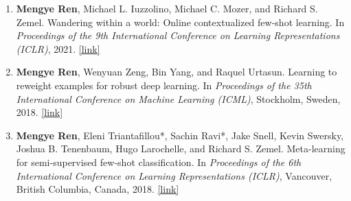 \documentclass{res}
\begin{document}
\begin{resume}
\begin{enumerate}[leftmargin=*]
\item
\textbf{Mengye Ren}, Michael L. Iuzzolino, Michael C. Mozer, and Richard S. Zemel.
Wandering within a world: Online contextualized few-shot learning.
In \textit{Proceedings of the 9th International Conference on Learning Representations (ICLR)}, 2021. \href{https://arxiv.org/abs/2007.04546}{[link]}

\item
\textbf{Mengye Ren}, Wenyuan Zeng, Bin Yang, and Raquel Urtasun.
Learning to reweight examples for robust deep learning.
In \textit{Proceedings of the 35th International Conference on Machine Learning (ICML)}, Stockholm, Sweden, 2018. \href{https://arxiv.org/abs/1803.09050}{[link]}

\item
\textbf{Mengye Ren}, Eleni Triantafillou*, Sachin Ravi*, Jake Snell, Kevin Swersky,
Joshua B. Tenenbaum, Hugo Larochelle, and Richard S. Zemel.
Meta-learning for semi-supervised few-shot classification.
In \textit{Proceedings of the 6th International Conference on Learning Representations (ICLR)}, Vancouver, British Columbia, Canada, 2018. \href{https://arxiv.org/abs/1803.00676}{[link]}

\end{enumerate}
\end{resume}
\end{document}
